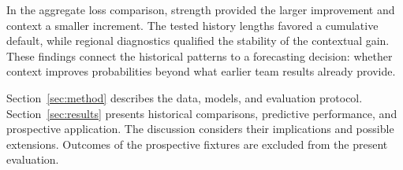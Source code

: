 In the aggregate loss comparison, strength provided the larger improvement and context a smaller increment. The tested history lengths favored a cumulative default, while regional diagnostics qualified the stability of the contextual gain. These findings connect the historical patterns to a forecasting decision: whether context improves probabilities beyond what earlier team results already provide.

Section~\ref{sec:method} describes the data, models, and evaluation protocol. Section~\ref{sec:results} presents historical comparisons, predictive performance, and prospective application. The discussion considers their implications and possible extensions. Outcomes of the prospective fixtures are excluded from the present evaluation.
